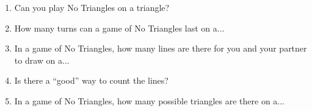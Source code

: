\documentclass{article}
\begin{document}
    \begin{enumerate}
        \item Can you play No Triangles on a triangle? %
        \item How many turns can a game of No Triangles last on a...\\ %
        \item In a game of No Triangles, how many lines are there for you and your partner to draw on a...\\
        \item Is there a ``good'' way to count the lines? 
        \item In a game of No Triangles, how many possible triangles are there on a...\\

\end{enumerate}
\end{document}
